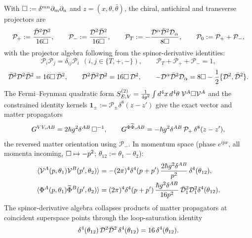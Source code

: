 With $\Box:=\delta^{mn}\partial_m\partial_n$ and $z=(x,\theta,\bar\theta)$, the chiral, antichiral and transverse projectors are
\begin{equation}\label{eq:gaugebv:projectors}
\mathcal P_+:=\frac{\bar{\mathcal{D}}^2\mathcal{D}^2}{16\Box},\qquad
\mathcal P_-:=\frac{\mathcal{D}^2\bar{\mathcal{D}}^2}{16\Box},\qquad
\mathcal P_T:=-\frac{\mathcal{D}^\alpha\bar{\mathcal{D}}^2\mathcal{D}_\alpha}{8\Box},\qquad
\mathcal P_0:=\mathcal P_++\mathcal P_-,
\end{equation}
with the projector algebra following from the spinor-derivative identities:
\begin{equation}\label{eq:gaugebv:dalgebra}
\mathcal P_i\mathcal P_j=\delta_{ij}\mathcal P_i\ \ (i,j\in\{T,+,-\}),\qquad
\mathcal P_T+\mathcal P_++\mathcal P_-=1,
\end{equation}
\begin{equation}\label{eq:gaugebv:Didentities}
\bar{\mathcal{D}}^2\mathcal{D}^2\bar{\mathcal{D}}^2=16\Box\,\bar{\mathcal{D}}^2,\qquad
\mathcal{D}^2\bar{\mathcal{D}}^2\mathcal{D}^2=16\Box\,\mathcal{D}^2,\qquad
-\mathcal{D}^\alpha\bar{\mathcal{D}}^2\mathcal{D}_\alpha=8\Box-\frac12\{\mathcal{D}^2,\bar{\mathcal{D}}^2\}.
\end{equation}
The Fermi--Feynman quadratic form $S^{(2)}_{E,V}=\tfrac1{4g^2}\int d^4x\,d^4\theta\;\mathcal{V}^A\Box\mathcal{V}^A$ and the constrained identity kernels $\mathbf1_\pm:=\mathcal P_\pm\delta^8(z-z')$ give the exact vector and matter propagators
\begin{equation}\label{eq:gaugebv:propagators}
G^{VV,AB}=2\hbar g^2\delta^{AB}\,\Box^{-1},\qquad
G^{\Phi\widetilde\Phi,AB}=-\hbar g^2\delta^{AB}\,\mathcal P_+\,\delta^8(z-z'),
\end{equation}
the reversed matter orientation using $\mathcal P_-$. In momentum space (phase $e^{ipx}$, all momenta incoming, $\Box\mapsto-p^2$; $\theta_{12}:=\theta_1-\theta_2$):
\begin{equation}\label{eq:gaugebv:momprop}
\begin{aligned}
\langle\mathcal{V}^A(p,\theta_1)\mathcal{V}^B(p',\theta_2)\rangle
&=-(2\pi)^4\delta^4(p+p')\,\frac{2\hbar g^2\delta^{AB}}{p^2}\,\delta^4(\theta_{12}),\\
\langle\Phi^A(p,\theta_1)\widetilde\Phi^B(p',\theta_2)\rangle
&=(2\pi)^4\delta^4(p+p')\,\frac{\hbar g^2\delta^{AB}}{16p^2}\,\bar{\mathcal{D}}_1^2\mathcal{D}_1^2\delta^4(\theta_{12}).
\end{aligned}
\end{equation}
The spinor-derivative algebra collapses products of matter propagators at coincident superspace points through the loop-saturation identity
\begin{equation}\label{eq:gaugebv:saturation}
\delta^4(\theta_{12})\,\mathcal{D}^2\bar{\mathcal{D}}^2\,\delta^4(\theta_{12})=16\,\delta^4(\theta_{12}).
\end{equation}

